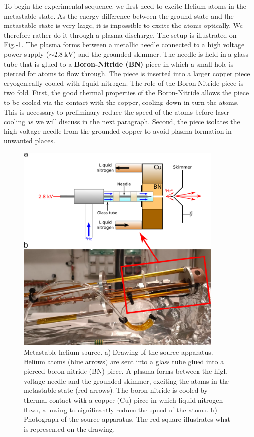 To begin the experimental sequence, we first need to excite Helium atoms in the metastable state. As the energy difference between the ground-state and the metastable state is very large, it is impossible to excite the atoms optically. We therefore rather do it through a plasma discharge. The setup is illustrated on Fig.-\ref{fig:source}. The plasma forms between a metallic needle connected to a high voltage power supply ($\sim 2.8 \ \mathrm{kV}$) and the grounded skimmer. The needle is held in a glass tube that is glued to a \textbf{Boron-Nitride (BN)} piece in which a small hole is pierced for atoms to flow through. The piece is inserted into a larger copper piece cryogenically cooled with liquid nitrogen. The role of the Boron-Nitride piece is two fold. First, the good thermal properties of the Boron-Nitride allows the piece to be cooled via the contact with the copper, cooling down in turn the atoms. This is necessary to preliminary reduce the speed of the atoms before laser cooling as we will discuss in the next paragraph. Second, the piece isolates the high voltage needle from the grounded copper to avoid plasma formation in unwanted places.

\begin{figure}
    \centering
    \includegraphics[width=0.9\textwidth]{Fig/Chapter3/source.png}
    \caption{Metastable helium source. a) Drawing of the source apparatus. Helium atoms (blue arrows) are sent into a glass tube glued into a pierced boron-nitride (BN) piece. A plasma forms between the high voltage needle and the grounded skimmer, exciting the atoms in the metastable state (red arrows). The boron nitride is cooled by thermal contact with a copper (Cu) piece in which liquid nitrogen flows, allowing to significantly reduce the speed of the atoms. b) Photograph of the source apparatus. The red square illustrates what is represented on the drawing.}
    \label{fig:source}
\end{figure}

